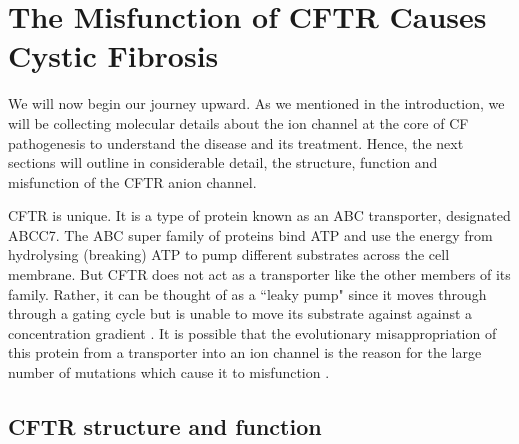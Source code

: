 \section{The Misfunction of CFTR Causes Cystic Fibrosis}

We will now begin our journey upward. As we mentioned in the introduction, we will be collecting molecular details about the ion channel at the core of CF pathogenesis to understand the disease and its treatment. Hence, the next sections will outline in considerable detail, the structure, function and misfunction of the CFTR anion channel. 

CFTR is unique. It is a type of protein known as an ABC transporter, designated ABCC7. The ABC super family of proteins bind ATP and use the energy from hydrolysing (breaking) ATP to pump different substrates across the cell membrane. But CFTR does not act as a transporter like the other members of its family. Rather, it can be thought of as a ``leaky pump" since it moves through through a gating cycle but is unable to move its substrate against against a concentration gradient \cite{gadsby2006,linsdell2018}. It is possible that the evolutionary misappropriation of this protein from a transporter into an ion channel is the reason for the large number of mutations which cause it to misfunction \cite{infield2021}. 


\subsection{CFTR structure and function}

